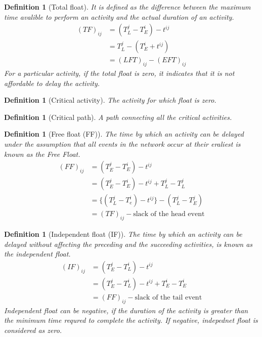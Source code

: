 \documentclass[oneside,11pt,pdftex]{book}%
\numberwithin{equation}{section}
\newtheorem{definition}[theorem]{Definition}
\numberwithin{section}{chapter}
\numberwithin{equation}{chapter}
\begin{document}
\begin{definition}[Total float]
	It is defined as the difference between the maximum time avalible to perform an activity and the actual duration of an activity.
	\begin{align*}
		(TF)_{ij}&=(T_L^j-T_E^i)-t^{ij}\\
		&=T_L^j-(T_E^i+t^{ij})\\
		&=(LFT)_{ij}-(EFT)_{ij}
	\end{align*}
For a particular activity, if the total float is zero, it indicates that it is not affordable to delay the activity.
\end{definition}

\begin{definition}[Critical activity]
	The activity for which float is zero.
\end{definition}

\begin{definition}[Critical path]
	A path connecting all the critical activities.
\end{definition}

\begin{definition}[Free float (FF)]
	The time by which an activity can be delayed under the assumption that all events in the network occur at their eraliest is known as the Free Float.\\
	\begin{align*}
		(FF)_{ij}&=(T_E^j-T_E^i)-t^{ij}\\
		&=(T_E^j-T_E^i)-t^{ij}+T_L^{j}-T_L^j\\
		&=\{(T_L^j-T_e^i)-t^{ij}\}-(T_L^j-T_E^j)\\
		&=(TF)_{ij}-\text{slack of the head event}
	\end{align*}
\end{definition}

\begin{definition}[Independent float (IF)]
	The time by which an activity can be delayed without affecting the preceding and the succeeding activities, is known as the independent float.
	\begin{align*}
		(IF)_{ij}&=(T_E^j-T_L^i)-t^{ij}\\
		&=(T_E^j-T_L^i)-t^{ij}+T_E^i-T_E^i\\
		&=(FF)_{ij}-\text{slack of the tail event}
	\end{align*} 
Independent float can be negative, if the duration of the activity is greater than the minimum time requred to complete the activity. If negative, indepednet float is considered as zero.
\end{definition}
\end{document}
